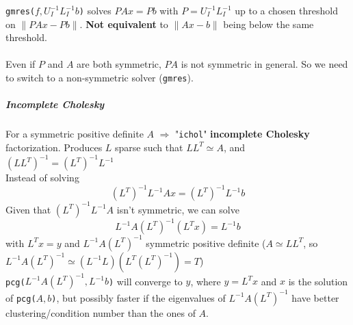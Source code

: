 \documentclass[10pt]{report}
\begin{document}
\texttt{gmres($f, U_I^{-1}L_I^{-1}b$)} solves $PAx=Pb$ with $P = U_I^{-1}L_I^{-1}$ up to a chosen threshold on $\|PAx-Pb\|$. \textbf{Not equivalent} to $\|Ax-b\|$ being below the same threshold.\\\\
Even if $P$ and $A$ are both symmetric, $PA$ is not symmetric in general. So we need to switch to a non-symmetric solver (\texttt{gmres}).
\subparagraph{Incomplete Cholesky} For a symmetric positive definite $A$ $\Rightarrow$ "\texttt{ichol}" \textbf{incomplete Cholesky} factorization. Produces $L$ sparse such that $LL^T\simeq A$, and $(LL^T)^{-1}=(L^T)^{-1}L^{-1}$\\
Instead of solving $$(L^T)^{-1}L^{-1}Ax = (L^T)^{-1}L^{-1}b$$ Given that $(L^T)^{-1}L^{-1}A$ isn't symmetric, we can solve $$L^{-1}A(L^T)^{-1}(L^Tx) = L^{-1}b$$ with $L^Tx=y$ and $L^{-1}A(L^T)^{-1}$ symmetric positive definite ($A\simeq LL^T$, so $L^{-1}A(L^T)^{-1}\simeq(L^{-1}L)(L^T(L^T)^{-1}) = T$)\\
\texttt{pcg($L^{-1}A(L^T)^{-1},L^{-1}b$)} will converge to $y$, where $y=L^Tx$ and $x$ is the solution of \texttt{pcg($A,b$)}, but possibly faster if the eigenvalues of $L^{-1}A(L^T)^{-1}$ have better clustering/condition number than the ones of $A$.
\end{document}
